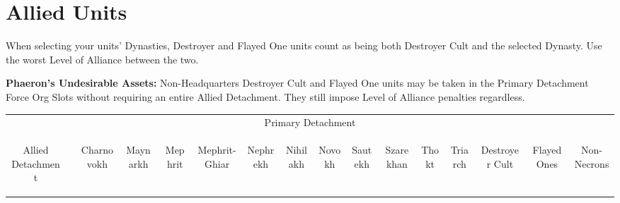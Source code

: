 \section{Allied Units}

When selecting your units' Dynasties, Destroyer and Flayed One units count as being both Destroyer Cult and the selected Dynasty. Use the worst Level of Alliance between the two.

\textbf{Phaeron's Undesirable Assets:} Non-Headquarters Destroyer Cult and Flayed One units may be taken in the Primary Detachment Force Org Slots without requiring an entire Allied Detachment. They still impose Level of Alliance penalties regardless.

\begin{tabular}{||c c c c c c c c c c c c c c c c||}
	\hline
	\multicolumn{16}{||c||}{Primary Detachment} \\
	\multirow{15}{*}{\begin{sideways}Allied Detachment\end{sideways}} & & \begin{sideways}Charnovokh \end{sideways} & \begin{sideways}Maynarkh \end{sideways} & \begin{sideways}Mephrit \end{sideways} & \begin{sideways}Mephrit-Ghiar \end{sideways} & \begin{sideways}Nephrekh \end{sideways} & \begin{sideways}Nihilakh \end{sideways} & \begin{sideways}Novokh \end{sideways} & \begin{sideways}Sautekh \end{sideways} & \begin{sideways}Szarekhan \end{sideways} & \begin{sideways}Thokt \end{sideways} & \begin{sideways}Triarch \end{sideways} & \begin{sideways}Destroyer Cult \end{sideways} & \begin{sideways}Flayed Ones \end{sideways} & \begin{sideways}Non-Necrons \end{sideways}\\

\end{tabular}
